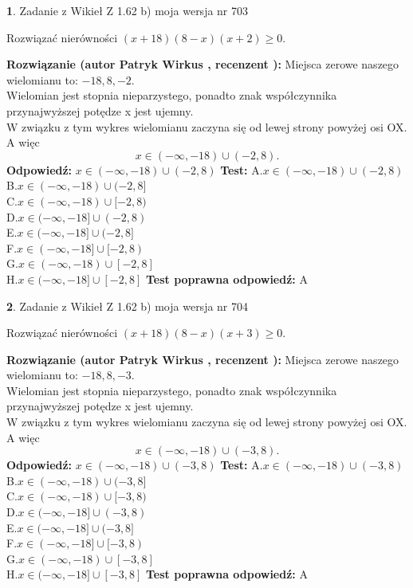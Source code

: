 \documentclass[12pt, a4paper]{article}
\theoremstyle{definition} %
\newtheorem{zad}{}
\newcommand{\zadStart}[1]{\begin{zad}#1\newline}
\newcommand{\zadStop}{\end{zad}}
\newcommand{\rozwStart}[2]{\noindent \textbf{Rozwiązanie (autor #1 , recenzent #2): }\newline}
\newcommand{\rozwStop}{\newline}
\newcommand{\odpStart}{\noindent \textbf{Odpowiedź:}\newline}
\newcommand{\odpStop}{\newline}
\newcommand{\testStart}{\noindent \textbf{Test:}\newline}
\newcommand{\testStop}{\newline}
\newcommand{\kluczStart}{\noindent \textbf{Test poprawna odpowiedź:}\newline}
\newcommand{\kluczStop}{\newline}
\begin{document}
\zadStart{Zadanie z Wikieł Z 1.62 b) moja wersja nr 703}

Rozwiązać nierówności $(x+18)(8-x)(x+2)\ge0$.
\zadStop
\rozwStart{Patryk Wirkus}{}
Miejsca zerowe naszego wielomianu to: $-18, 8, -2$.\\
Wielomian jest stopnia nieparzystego, ponadto znak współczynnika przy\linebreak najwyższej potędze x jest ujemny.\\ W związku z tym wykres wielomianu zaczyna się od lewej strony powyżej osi OX. A więc $$x \in (-\infty,-18) \cup (-2,8).$$
\rozwStop
\odpStart
$x \in (-\infty,-18) \cup (-2,8)$
\odpStop
\testStart
A.$x \in (-\infty,-18) \cup (-2,8)$\\
B.$x \in (-\infty,-18) \cup (-2,8]$\\
C.$x \in (-\infty,-18) \cup [-2,8)$\\
D.$x \in (-\infty,-18] \cup (-2,8)$\\
E.$x \in (-\infty,-18] \cup (-2,8]$\\
F.$x \in (-\infty,-18] \cup [-2,8)$\\
G.$x \in (-\infty,-18) \cup [-2,8]$\\
H.$x \in (-\infty,-18] \cup [-2,8]$
\testStop
\kluczStart
A
\kluczStop



\zadStart{Zadanie z Wikieł Z 1.62 b) moja wersja nr 704}

Rozwiązać nierówności $(x+18)(8-x)(x+3)\ge0$.
\zadStop
\rozwStart{Patryk Wirkus}{}
Miejsca zerowe naszego wielomianu to: $-18, 8, -3$.\\
Wielomian jest stopnia nieparzystego, ponadto znak współczynnika przy\linebreak najwyższej potędze x jest ujemny.\\ W związku z tym wykres wielomianu zaczyna się od lewej strony powyżej osi OX. A więc $$x \in (-\infty,-18) \cup (-3,8).$$
\rozwStop
\odpStart
$x \in (-\infty,-18) \cup (-3,8)$
\odpStop
\testStart
A.$x \in (-\infty,-18) \cup (-3,8)$\\
B.$x \in (-\infty,-18) \cup (-3,8]$\\
C.$x \in (-\infty,-18) \cup [-3,8)$\\
D.$x \in (-\infty,-18] \cup (-3,8)$\\
E.$x \in (-\infty,-18] \cup (-3,8]$\\
F.$x \in (-\infty,-18] \cup [-3,8)$\\
G.$x \in (-\infty,-18) \cup [-3,8]$\\
H.$x \in (-\infty,-18] \cup [-3,8]$
\testStop
\kluczStart
A
\kluczStop
\end{document}

